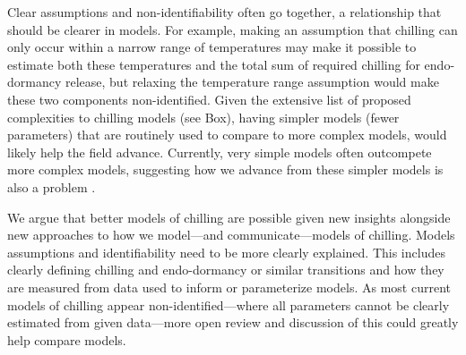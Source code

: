 \documentclass[11pt]{article}
\begin{document}
Clear assumptions and non-identifiability often go together, a relationship that should be clearer in models. For example, making an assumption that chilling can only occur within a narrow range of temperatures may make it possible to estimate both these temperatures and the total sum of required chilling for endo-dormancy release, but relaxing the temperature range assumption would make these two components non-identified. Given the extensive list of proposed complexities to chilling models (see Box), having simpler models (fewer parameters) that are routinely used to compare to more complex models, would likely help the field advance. Currently, very simple models often outcompete more complex models, suggesting how we advance from these simpler models is also a problem \citep[e.g.,][]{basler2016evaluating}. 

We argue that better models of chilling are possible given new insights alongside new approaches to how we model---and communicate---models of chilling. Models assumptions and identifiability need to be more clearly explained. This includes clearly defining chilling and endo-dormancy or similar transitions and how they are measured from data used to inform or parameterize models. As most current models of chilling appear non-identified---where all parameters cannot be clearly estimated from given data---more open review and discussion of this could greatly help compare models. 

\end{document}

